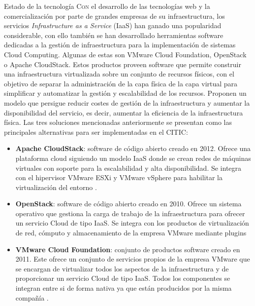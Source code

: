 \begin{chapter}{Estado de la tecnología}
\label{chap:estado-tecnologia}
    \lettrine{C}{on} el desarrollo de las tecnologías web y la comercialización por parte de grandes empresas de su infraestructura, los servicios \textit{Infrastructure as a Service} (IaaS) han ganado una popularidad considerable, con ello también se han desarrollado herramientas software dedicadas a la gestión de infraestructura para la implementación de sistemas Cloud Computing. Algunas de estas son VMware Cloud Foundation, OpenStack o Apache CloudStack. Estos productos proveen software que permite construir una infraestructura virtualizada sobre un conjunto de recursos físicos, con el objetivo de separar la administración de la capa física de la capa virtual para simplificar y automatizar la gestión y escalabilidad de los recursos. Proponen un modelo que persigue reducir costes de gestión de la infraestructura y aumentar la disponibilidad del servicio, es decir, aumentar la eficiencia de la infraestructura física. Las tres soluciones mencionadas anteriormente se presentan como las principales alternativas para ser implementadas en el CITIC:
    \begin{itemize}
        \item \textbf{Apache CloudStack}: software de código abierto creado en 2012. Ofrece una plataforma cloud siguiendo un modelo IaaS donde se crean redes de máquinas virtuales con soporte para la escalabilidad y alta disponibilidad. Se integra con el hipervisor VMware ESXi y VMware vSphere para habilitar la virtualización del entorno \cite{apache-cloudstack}.
        \item \textbf{OpenStack}: software de código abierto creado en 2010. Ofrece un sistema operativo que gestiona la carga de trabajo de la infraestructura para ofrecer un servicio Cloud de tipo IaaS. Se integra con los productos de virtualización de red, cómputo y almacenamiento de la empresa VMware mediante plugins \cite{openstack-overview}\cite{integrated-openstack}
        \item \textbf{VMware Cloud Foundation}: conjunto de productos software creado en 2011. Este ofrece un conjunto de servicios propios de la empresa VMware que se encargan de virtualizar todos los aspectos de la infraestructura y de proporcionar un servicio Cloud de tipo IaaS. Todos los componentes se integran entre si de forma nativa ya que están producidos por la misma compañía \cite{cloud-foundation}.
    \end{itemize}


\end{chapter}
